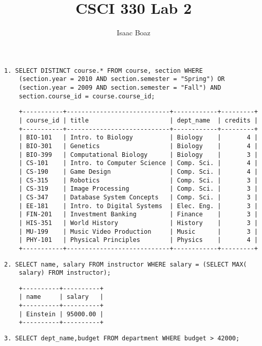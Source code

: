 \documentclass{article}
\title{CSCI 330 Lab 2}
\author{Isaac Boaz}
\begin{document}
\maketitle

\lstset{
    language=sql,
    basicstyle=\small,
    showstringspaces=false
}

\begin{lstlisting}
1. SELECT DISTINCT course.* FROM course, section WHERE
    (section.year = 2010 AND section.semester = "Spring") OR
    (section.year = 2009 AND section.semester = "Fall") AND
    section.course_id = course.course_id;
\end{lstlisting}
\begin{lstlisting}
    +-----------+----------------------------+------------+---------+
    | course_id | title                      | dept_name  | credits |
    +-----------+----------------------------+------------+---------+
    | BIO-101   | Intro. to Biology          | Biology    |       4 |
    | BIO-301   | Genetics                   | Biology    |       4 |
    | BIO-399   | Computational Biology      | Biology    |       3 |
    | CS-101    | Intro. to Computer Science | Comp. Sci. |       4 |
    | CS-190    | Game Design                | Comp. Sci. |       4 |
    | CS-315    | Robotics                   | Comp. Sci. |       3 |
    | CS-319    | Image Processing           | Comp. Sci. |       3 |
    | CS-347    | Database System Concepts   | Comp. Sci. |       3 |
    | EE-181    | Intro. to Digital Systems  | Elec. Eng. |       3 |
    | FIN-201   | Investment Banking         | Finance    |       3 |
    | HIS-351   | World History              | History    |       3 |
    | MU-199    | Music Video Production     | Music      |       3 |
    | PHY-101   | Physical Principles        | Physics    |       4 |
    +-----------+----------------------------+------------+---------+        
    \end{lstlisting}
\begin{lstlisting}
2. SELECT name, salary FROM instructor WHERE salary = (SELECT MAX(
    salary) FROM instructor);
    \end{lstlisting}
\begin{lstlisting}
    +----------+----------+
    | name     | salary   |
    +----------+----------+
    | Einstein | 95000.00 |
    +----------+----------+
    \end{lstlisting}

\begin{lstlisting}
3. SELECT dept_name,budget FROM department WHERE budget > 42000;
\end{lstlisting}
\end{document}
